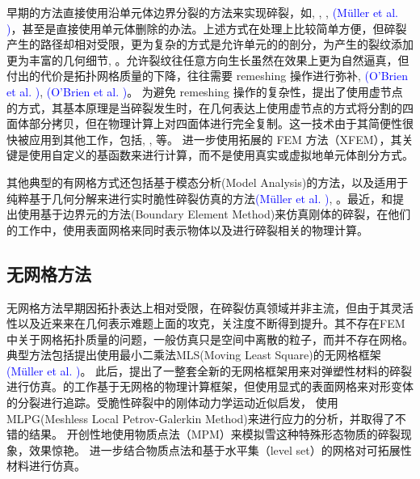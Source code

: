 早期的方法直接使用沿单元体边界分裂的方法来实现碎裂，如, , , \textcolor{blue}{(M\"{u}ller et al. )\parencite{Muller2001}}，甚至是直接使用单元体删除的办法。上述方式在处理上比较简单方便，但碎裂产生的路径却相对受限，更为复杂的方式是允许单元的的剖分，为产生的裂纹添加更为丰富的几何细节, 。允许裂纹往任意方向生长虽然在效果上更为自然逼真，但付出的代价是拓扑网格质量的下降，往往需要 remeshing 操作进行弥补, \textcolor{blue}{(O'Brien et al. )\parencite{OBrien1999}}, \textcolor{blue}{(O'Brien et al. )\parencite{OBrien2002}}。 为避免 remeshing 操作的复杂性，提出了使用虚节点的方式，其基本原理是当碎裂发生时，在几何表达上使用虚节点的方式将分割的四面体部分拷贝，但在物理计算上对四面体进行完全复制。这一技术由于其简便性很快被应用到其他工作，包括, , 等。 进一步使用拓展的 FEM 方法（XFEM），其关键是使用自定义的基函数来进行计算，而不是使用真实或虚拟地单元体剖分方式。

其他典型的有网格方式还包括基于模态分析(Model Analysis)的方法，以及适用于纯粹基于几何分解来进行实时脆性碎裂仿真的方法\textcolor{blue}{(M\"{u}ller et al. )\parencite{Muller2013}}, 。最近，和提出使用基于边界元的方法(Boundary Element Method)来仿真刚体的碎裂，在他们的工作中，使用表面网格来同时表示物体以及进行碎裂相关的物理计算。

\subsection{无网格方法}

无网格方法早期因拓扑表达上相对受限，在碎裂仿真领域并非主流，但由于其灵活性以及近来来在几何表示难题上面的攻克，关注度不断得到提升。其不存在FEM 中关于网格拓扑质量的问题，一般仿真只是空间中离散的粒子，而并不存在网格。典型方法包括提出使用最小二乘法MLS(Moving Least Square)的无网格框架\textcolor{blue}{(M\"{u}ller et al. )\parencite{Muller2004}}。 此后，提出了一整套全新的无网格框架用来对弹塑性材料的碎裂进行仿真。的工作基于无网格的物理计算框架，但使用显式的表面网格来对形变体的分裂进行追踪。受脆性碎裂中的刚体动力学运动近似启发，
使用MLPG(Meshless Local Petrov-Galerkin Method)来进行应力的分析，并取得了不错的结果。
开创性地使用物质点法（MPM）来模拟雪这种特殊形态物质的碎裂现象，效果惊艳。
进一步结合物质点法和基于水平集（level set）的网格对可拓展性材料进行仿真。

